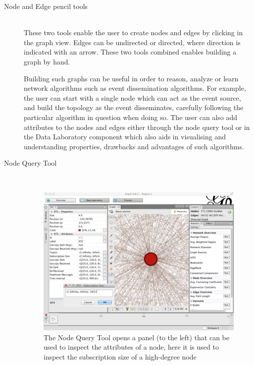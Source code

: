 \begin{description}

\item[Node and Edge pencil tools] \hfill \\

    These two tools enable the user to create nodes and edges by
    clicking in the graph view. Edges can be undirected or directed,
    where direction is indicated with an arrow. These two tools combined
    enables building a graph by hand.

    Building such graphs can be useful in order to reason, analyze or
    learn network algorithms such as event dissemination algorithms.
    For example, the user can start with a single node which can act as
    the event source, and build the topology as the event disseminates,
    carefully following the particular algorithm in question when doing
    so. The user can also add attributes to the nodes and edges either
    through the node query tool or in the Data Laboratory component
    which also aids in visualising and understanding properties,
    drawbacks and advantages of such algorithms.

\item[Node Query Tool] \hfill \\

    \begin{figure}[h!]
        \centering
        \includegraphics[width=\linewidth]{figures/gui_node_query}
        \caption{The Node Query Tool opens a panel (to the left) that can be used to inspect the
            attributes of a node, here it is used to inspect the
            subscription size of a high-degree node}
        \label{fig:gui_node_query}
    \end{figure}


\end{description}
